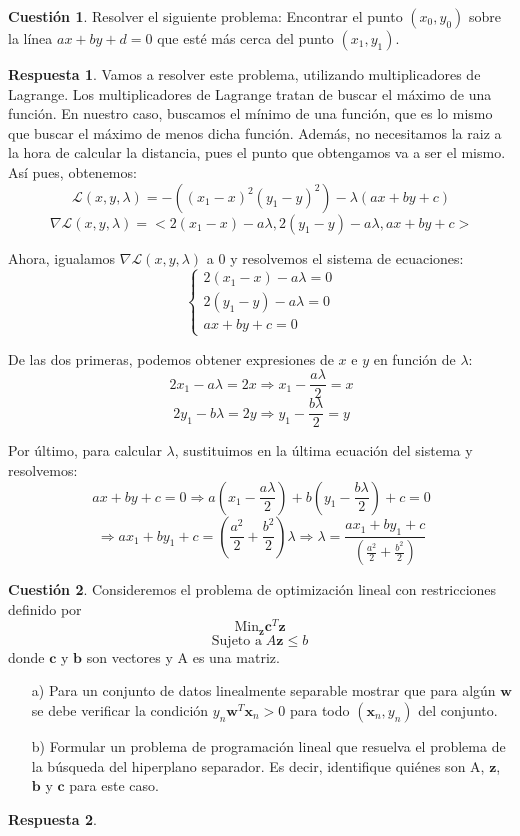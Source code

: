\documentclass[10pt,a4paper]{article}
\theoremstyle{definition}
\newtheorem{cuestion}{Cuestión}
\newtheorem*{respuesta}{Respuesta}
\begin{document}
\begin{cuestion}
Resolver el siguiente problema: Encontrar el punto $(x_0,y_0)$ sobre la línea $ax+by+d=0$ que esté más cerca del punto $(x_1,y_1)$.
\end{cuestion}
\begin{respuesta}
Vamos a resolver este problema, utilizando multiplicadores de Lagrange. Los multiplicadores de Lagrange tratan de buscar el máximo de una función. En nuestro caso, buscamos el mínimo de una función, que es lo mismo que buscar el máximo de menos dicha función. Además, no necesitamos la raiz a la hora de calcular la distancia, pues el punto que obtengamos va a ser el mismo. Así pues, obtenemos:
\[
\ \mathcal{L}(x,y,\lambda) = -\left((x_1-x)^2(y_1-y)^2\right)-\lambda(ax+by+c)
\]
\[
\ \nabla \mathcal{L}(x,y,\lambda) = < 2(x_1-x)-a\lambda,2(y_1-y)-a\lambda, ax+by+c>
\]

Ahora, igualamos $\nabla \mathcal{L}(x,y,\lambda)$ a 0 y resolvemos el sistema de ecuaciones:
\[
\ \begin{cases} 2(x_1-x)-a\lambda=0 \\ 2(y_1-y)-a\lambda=0 \\ ax+by+c =0 \end{cases}
\]

De las dos primeras, podemos obtener expresiones de $x$ e $y$ en función de $\lambda$:
\[
\ 2x_1-a\lambda = 2x \Rightarrow x_1-\frac{a\lambda}{2} = x
\]
\[
\ 2y_1-b\lambda = 2y \Rightarrow y_1-\frac{b\lambda}{2} = y
\]

Por último, para calcular $\lambda$, sustituimos en la última ecuación del sistema y resolvemos:
\[
\ ax+by+c =0\Rightarrow a\left(x_1-\frac{a\lambda}{2}\right)+b\left(y_1-\frac{b\lambda}{2}\right)+c = 0
\]
\[
\ \Rightarrow ax_1+by_1+c = \left(\frac{a^2}{2}+\frac{b^2}{2}\right)\lambda \Rightarrow \lambda = \frac{ax_1+by_1+c }{\left(\frac{a^2}{2}+\frac{b^2}{2}\right)}
\]
\end{respuesta}

\begin{cuestion}
Consideremos el problema de optimización lineal con restricciones definido por 
\[	\textrm{Min}_{\mathbf{z}}\mathbf{c}^T\mathbf{z}	\]
\[	\textrm{Sujeto a}\; A\mathbf{z} \leq b	\]
donde $\mathbf{c}$ y $\mathbf{b}$ son vectores y A es una matriz.
\begin{enumerate}
\item[a)] Para un conjunto de datos linealmente separable mostrar que para algún $\mathbf{w}$ se debe verificar la condición $y_n\mathbf{w}^T\mathbf{x}_n > 0$ para todo $(\mathbf{x}_n, y_n)$ del conjunto.
\item[b)] Formular un problema de programación lineal que resuelva el problema de la búsqueda del hiperplano separador. Es decir, identifique quiénes son A, $\mathbf{z}$, $\mathbf{b}$ y $\mathbf{c}$ para este caso.
\end{enumerate}
\end{cuestion}
\begin{respuesta}
\end{respuesta}
\end{document}
